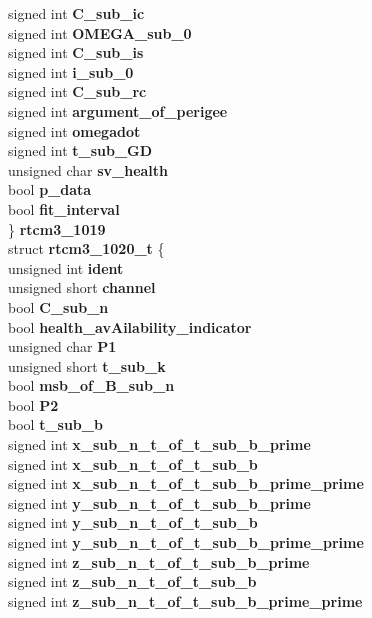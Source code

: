 \begin{DoxyCompactItemize}
{\begin{tabbing}
\>\>signed int {\bfseries C\_sub\_ic}\\
\>\>signed int {\bfseries OMEGA\_sub\_0}\\
\>\>signed int {\bfseries C\_sub\_is}\\
\>\>signed int {\bfseries i\_sub\_0}\\
\>\>signed int {\bfseries C\_sub\_rc}\\
\>\>signed int {\bfseries argument\_of\_perigee}\\
\>\>signed int {\bfseries omegadot}\\
\>\>signed int {\bfseries t\_sub\_GD}\\
\>\>unsigned char {\bfseries sv\_health}\\
\>\>bool {\bfseries p\_data}\\
\>\>bool {\bfseries fit\_interval}\\
\>\} {\bfseries rtcm3\_1019}\\
\>struct {\bfseries rtcm3\_1020\_t} \{\\
\>\>unsigned int {\bfseries ident}\\
\>\>unsigned short {\bfseries channel}\\
\>\>bool {\bfseries C\_sub\_n}\\
\>\>bool {\bfseries health\_avAilability\_indicator}\\
\>\>unsigned char {\bfseries P1}\\
\>\>unsigned short {\bfseries t\_sub\_k}\\
\>\>bool {\bfseries msb\_of\_B\_sub\_n}\\
\>\>bool {\bfseries P2}\\
\>\>bool {\bfseries t\_sub\_b}\\
\>\>signed int {\bfseries x\_sub\_n\_t\_of\_t\_sub\_b\_prime}\\
\>\>signed int {\bfseries x\_sub\_n\_t\_of\_t\_sub\_b}\\
\>\>signed int {\bfseries x\_sub\_n\_t\_of\_t\_sub\_b\_prime\_prime}\\
\>\>signed int {\bfseries y\_sub\_n\_t\_of\_t\_sub\_b\_prime}\\
\>\>signed int {\bfseries y\_sub\_n\_t\_of\_t\_sub\_b}\\
\>\>signed int {\bfseries y\_sub\_n\_t\_of\_t\_sub\_b\_prime\_prime}\\
\>\>signed int {\bfseries z\_sub\_n\_t\_of\_t\_sub\_b\_prime}\\
\>\>signed int {\bfseries z\_sub\_n\_t\_of\_t\_sub\_b}\\
\>\>signed int {\bfseries z\_sub\_n\_t\_of\_t\_sub\_b\_prime\_prime}\\

\end{tabbing}}
\end{DoxyCompactItemize}
